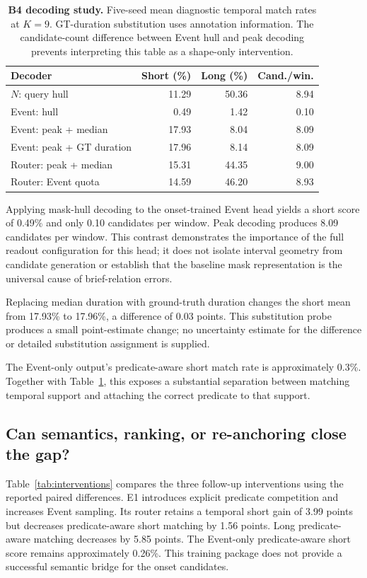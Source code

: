 \documentclass[10pt,twocolumn,letterpaper]{article}
\begin{document}
\begin{table}[t]
\centering\small
\setlength{\tabcolsep}{3pt}
\begin{tabular}{lrrr}
\toprule
Decoder & Short (\%) & Long (\%) & Cand./win.\\
\midrule
$N$: query hull & 11.29 & 50.36 & 8.94\\
Event: hull & 0.49 & 1.42 & 0.10\\
Event: peak + median & 17.93 & 8.04 & 8.09\\
Event: peak + GT duration & 17.96 & 8.14 & 8.09\\
Router: peak + median & 15.31 & 44.35 & 9.00\\
Router: Event quota & 14.59 & 46.20 & 8.93\\
\bottomrule
\end{tabular}
\caption{\textbf{B4 decoding study.} Five-seed mean diagnostic temporal match rates at $K=9$. GT-duration substitution uses annotation information. The candidate-count difference between Event hull and peak decoding prevents interpreting this table as a shape-only intervention.}
\label{tab:decode}
\end{table}

Applying mask-hull decoding to the onset-trained Event head yields a short score of 0.49\% and only 0.10 candidates per window. Peak decoding produces 8.09 candidates per window. This contrast demonstrates the importance of the full readout configuration for this head; it does not isolate interval geometry from candidate generation or establish that the baseline mask representation is the universal cause of brief-relation errors.

Replacing median duration with ground-truth duration changes the short mean from 17.93\% to 17.96\%, a difference of 0.03 points. This substitution probe produces a small point-estimate change; no uncertainty estimate for the difference or detailed substitution assignment is supplied.

The Event-only output's predicate-aware short match rate is approximately 0.3\%. Together with Table~\ref{tab:decode}, this exposes a substantial separation between matching temporal support and attaching the correct predicate to that support.

\subsection{Can semantics, ranking, or re-anchoring close the gap?}
Table~\ref{tab:interventions} compares the three follow-up interventions using the reported paired differences. E1 introduces explicit predicate competition and increases Event sampling. Its router retains a temporal short gain of 3.99 points but decreases predicate-aware short matching by 1.56 points. Long predicate-aware matching decreases by 5.85 points. The Event-only predicate-aware short score remains approximately 0.26\%. This training package does not provide a successful semantic bridge for the onset candidates.
\end{document}
